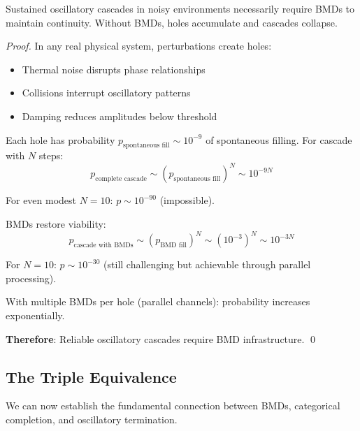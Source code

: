 \begin{corollary}
\label{cor:cascades_require_bmds}
Sustained oscillatory cascades in noisy environments necessarily require BMDs to maintain continuity. Without BMDs, holes accumulate and cascades collapse.
\end{corollary}

\begin{proof}
In any real physical system, perturbations create holes:
\begin{itemize}
\item Thermal noise disrupts phase relationships
\item Collisions interrupt oscillatory patterns
\item Damping reduces amplitudes below threshold
\end{itemize}

Each hole has probability $p_{\text{spontaneous fill}} \sim 10^{-9}$ of spontaneous filling. For cascade with $N$ steps:
\begin{equation}
p_{\text{complete cascade}} \sim (p_{\text{spontaneous fill}})^N \sim 10^{-9N}
\end{equation}

For even modest $N = 10$: $p \sim 10^{-90}$ (impossible).

BMDs restore viability:
\begin{equation}
p_{\text{cascade with BMDs}} \sim (p_{\text{BMD fill}})^N \sim (10^{-3})^N \sim 10^{-3N}
\end{equation}

For $N = 10$: $p \sim 10^{-30}$ (still challenging but achievable through parallel processing).

With multiple BMDs per hole (parallel channels): probability increases exponentially.

\textbf{Therefore}: Reliable oscillatory cascades require BMD infrastructure. \qed
\end{proof}

\subsection{The Triple Equivalence}

We can now establish the fundamental connection between BMDs, categorical completion, and oscillatory termination.

